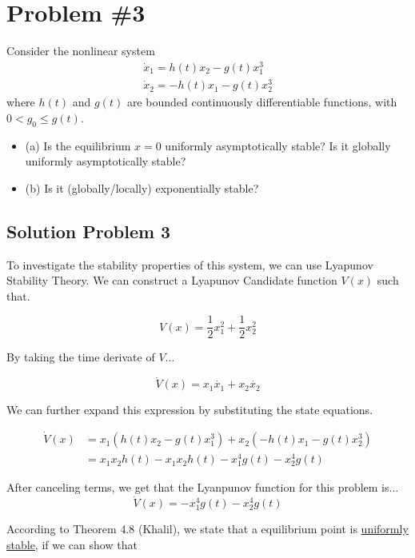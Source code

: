 \section*{Problem \#3}

Consider the nonlinear system
$$
\begin{array}{l}
\dot{x}_{1}=h(t) x_{2}-g(t) x_{1}^{3} \\
\dot{x}_{2}=-h(t) x_{1}-g(t) x_{2}^{3}
\end{array}
$$
where $h(t)$ and $g(t)$ are bounded continuously differentiable functions, with $0<g_{0} \leq g(t)$.


\begin{itemize}
  \item (a) Is the equilibrium $x=0$ uniformly asymptotically stable? Is it globally uniformly asymptotically stable?
  \item (b) Is it (globally/locally) exponentially stable?
\end{itemize}



\subsection*{Solution Problem 3}

To investigate the stability properties of this system, we can use Lyapunov Stability Theory. We can construct a Lyapunov Candidate function $V(x)$ such that.

$$
V(x) = \frac{1}{2} x_1^2 + \frac{1}{2} x_2^2
$$

\noindent By taking the time derivate of $V$...

$$
\dot{V}(x) = x_1\dot{x_1} + x_2\dot{x_2}
$$

\noindent We can further expand this expression by substituting the state equations.

$$
\begin{aligned}
\dot{V}(x) & = x_1\left( h(t) x_2 -g(t) x_1^3 \right) + x_2\left(-h(t) x_1 -g(t) x_2^3 \right) \\
& = x_1x_2h(t) -x_1x_2h(t) - x_1^4g(t) -x_2^4g(t)
\end{aligned}
$$

\noindent After canceling terms, we get that the Lyanpunov function for this problem is...
$$
\dot{V}(x) = - x_1^4g(t) -x_2^4g(t)
$$

\noindent According to Theorem 4.8 (Khalil), we state that a equilibrium point is \underline{uniformly stable}, if we can show that



